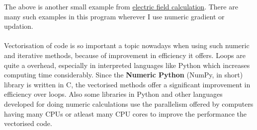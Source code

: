 \documentclass[11pt, a4paper]{article}
\begin{document}
The above is another small example from \hyperref[lst:EF]{electric field calculation}. There are many such examples in this program wherever I use numeric gradient or updation.
\\ \\
Vectorisation of code is so important a topic nowadays when using such numeric and iterative methods, because of improvement in efficiency it offers.
Loops are quite a overhead, especially in interpreted languages like Python which increases computing time considerably.
Since the \textbf{Numeric Python} (NumPy, in short) library is written in C, the vectorised methods offer a significant improvement in efficiency over loops.
Also some libraries in Python and other languages developed for doing numeric calculations use the parallelism offered by computers having many CPUs or atleast many CPU cores
to improve the performance the vectorised code.
\end{document}
